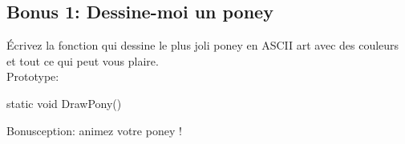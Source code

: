 \subsection{Bonus 1: Dessine-moi un poney}

Écrivez la fonction  qui dessine le plus joli poney en ASCII art avec
des couleurs et tout ce qui peut vous plaire.\\

Prototype:
\begin{code}
static void DrawPony()
\end{code}

Bonusception: animez votre poney !
